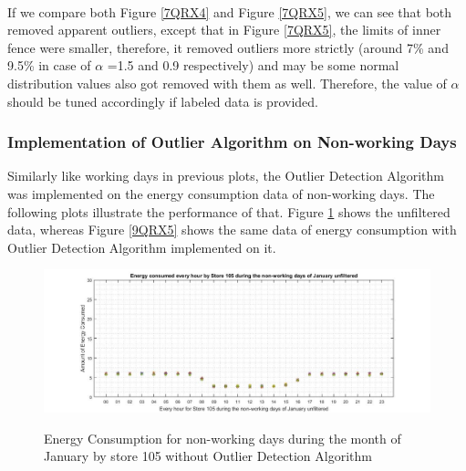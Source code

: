 \documentclass[12pt]{article}
\begin{document}
\paragraph{}If we compare both Figure \ref{7QRX4} and Figure \ref{7QRX5}, we can see that both removed apparent outliers, except that in Figure \ref{7QRX5}, the limits of inner fence were smaller, therefore, it removed outliers more strictly (around 7\% and 9.5\% in case of $\alpha$ =1.5 and 0.9 respectively) and may be some normal distribution values also got removed with them as well. Therefore, the value of $\alpha$ should be tuned accordingly if labeled data is provided. 

\subsubsection{Implementation of Outlier Algorithm on Non-working Days}
Similarly like working days in previous plots, the Outlier Detection Algorithm was implemented on the energy consumption data of non-working days. The following plots illustrate the performance of that. Figure \ref{8QRX5} shows the unfiltered data, whereas Figure \ref{9QRX5} shows the same data of energy consumption with Outlier Detection Algorithm implemented on it.

\begin{figure}[H]
	\centering
	{\includegraphics[scale=0.32]{alpha_15_unfiltered_off.jpg}\label{8QRX5}
	}
	\caption[Energy Consumption during the month of January by store 105 (same dataset as in Figure \ref{7blockdiag}) without outliers]{Energy Consumption for non-working days during the month of January by store 105 without Outlier Detection Algorithm}
	\label{8QRX5}
	\hspace{0.1cm}%
\end{figure}
\end{document}
